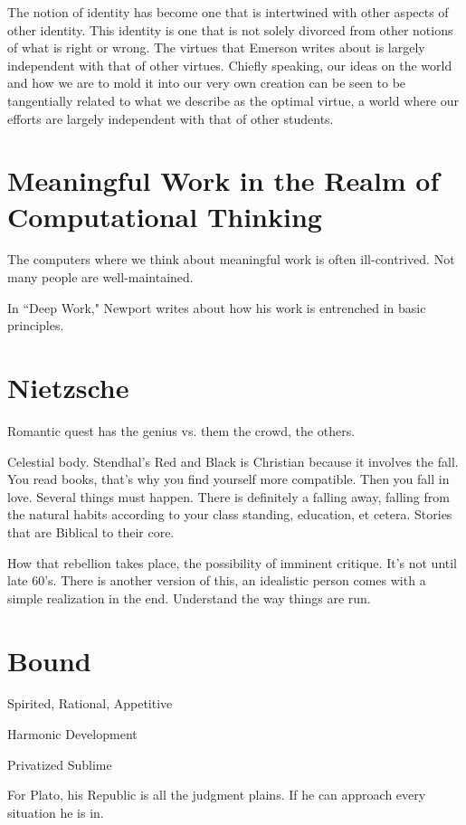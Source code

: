 \documentclass[12pt,letterpaper]{article}
\begin{document}
The notion of identity has become one that is intertwined with other aspects of other identity.  This identity is one that is not solely divorced from other notions of what is right or wrong.  The virtues that Emerson writes about is largely independent with that of other virtues.  Chiefly speaking, our ideas on the world and how we are to mold it into our very own creation can be seen to be tangentially related to what we describe as the optimal virtue, a world where our efforts are largely independent with that of other students.

\section{Meaningful Work in the Realm of Computational Thinking}
The computers where we think about meaningful work is often ill-contrived.  Not many people are well-maintained. 

In ``Deep Work," Newport writes about how his work is entrenched in basic principles.


\section{Nietzsche}

Romantic quest has the genius vs. them the crowd, the others.

Celestial body.  Stendhal's Red and Black is Christian because it involves the fall.  You read books, that's why you find yourself more compatible.  Then you fall in love.  Several things must happen.  There is definitely a falling away, falling from the natural habits according to your class standing, education, et cetera.  Stories that are Biblical to their core.

How that rebellion takes place, the possibility of imminent critique.  It's not until late 60's.  There is another version of this, an idealistic person comes with a simple realization in the end.  Understand the way things are run.

\section{Bound}

Spirited, Rational, Appetitive

Harmonic Development

Privatized Sublime


For Plato, his Republic is all the judgment plains.  If he can approach every situation he is in.  
\end{document}
